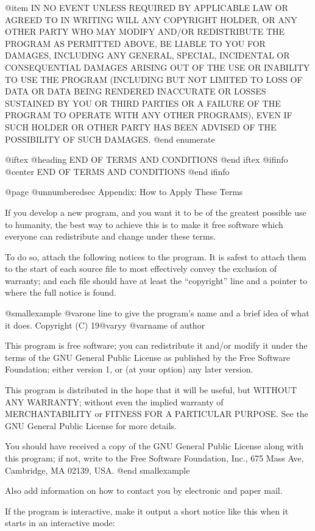 @item
IN NO EVENT UNLESS REQUIRED BY APPLICABLE LAW OR AGREED TO IN WRITING WILL
ANY COPYRIGHT HOLDER, OR ANY OTHER PARTY WHO MAY MODIFY AND/OR
REDISTRIBUTE THE PROGRAM AS PERMITTED ABOVE, BE LIABLE TO YOU FOR DAMAGES,
INCLUDING ANY GENERAL, SPECIAL, INCIDENTAL OR CONSEQUENTIAL DAMAGES
ARISING OUT OF THE USE OR INABILITY TO USE THE PROGRAM (INCLUDING BUT NOT
LIMITED TO LOSS OF DATA OR DATA BEING RENDERED INACCURATE OR LOSSES
SUSTAINED BY YOU OR THIRD PARTIES OR A FAILURE OF THE PROGRAM TO OPERATE
WITH ANY OTHER PROGRAMS), EVEN IF SUCH HOLDER OR OTHER PARTY HAS BEEN
ADVISED OF THE POSSIBILITY OF SUCH DAMAGES.
@end enumerate

@iftex
@heading END OF TERMS AND CONDITIONS
@end iftex
@ifinfo
@center END OF TERMS AND CONDITIONS
@end ifinfo

@page
@unnumberedsec Appendix: How to Apply These Terms

  If you develop a new program, and you want it to be of the greatest
possible use to humanity, the best way to achieve this is to make it
free software which everyone can redistribute and change under these
terms.

  To do so, attach the following notices to the program.  It is safest to
attach them to the start of each source file to most effectively convey
the exclusion of warranty; and each file should have at least the
``copyright'' line and a pointer to where the full notice is found.

@smallexample
@var{one line to give the program's name and a brief idea of what it does.}
Copyright (C) 19@var{yy}  @var{name of author}

This program is free software; you can redistribute it and/or modify
it under the terms of the GNU General Public License as published by
the Free Software Foundation; either version 1, or (at your option)
any later version.

This program is distributed in the hope that it will be useful,
but WITHOUT ANY WARRANTY; without even the implied warranty of
MERCHANTABILITY or FITNESS FOR A PARTICULAR PURPOSE.  See the
GNU General Public License for more details.

You should have received a copy of the GNU General Public License
along with this program; if not, write to the Free Software
Foundation, Inc., 675 Mass Ave, Cambridge, MA 02139, USA.
@end smallexample

Also add information on how to contact you by electronic and paper mail.

If the program is interactive, make it output a short notice like this
when it starts in an interactive mode:

